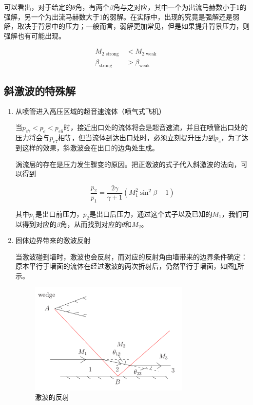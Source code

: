 可以看出，对于给定的$\theta$角，有两个$\beta$角与之对应，其中一个为出流马赫数小于1的强解，另一个为出流马赫数大于1的弱解。在实际中，出现的究竟是强解还是弱解，取决于背景中的压力；一般而言，弱解更加常见，但是如果提升背景压力，则强解也有可能出现。

\begin{align*}
    M_{2 \text { strong }}&<M_{2 \text { weak }}\\ 
    \beta_{\text {strong }}&>\beta_{\text {weak }}
\end{align*}

\subsection{斜激波的特殊解}

\begin{enumerate}
    \item 从喷管进入高压区域的超音速流体（喷气式飞机）
    
    当$p_{e7}<p_e<p_{e6}$时，接近出口处的流体将会是超音速流，并且在喷管出口处的压力将会与$p_{e7}$相等，但当流体到达出口处时，必须立刻提升压力到$p_e$，为了达到这样的效果，斜激波会在出口的边角处生成。

    涡流层的存在是压力发生骤变的原因。把正激波的式子代入斜激波的法向，可以得到

    \begin{equation*}
        \frac{p_{2}}{p_{1}}=\frac{2 \gamma}{\gamma+1}\left(M_{1}^{2} \sin ^{2} \beta-1\right)
    \end{equation*}

    其中$p_1$是出口前压力，$p_2$是出口后压力，通过这个式子以及已知的$M_1$，我们可以得到对应的$\beta$角，从而找到对应的$\theta$和$M_2$。

    \item 固体边界带来的激波反射
    
    当激波碰到墙时，激波也会反射，而对应的反射角由墙带来的边界条件确定：原本平行于墙面的流体在经过激波的两次折射后，仍然平行于墙面，如图\ref{9}所示。

    \begin{figure}[!ht]
        \centering
        \includegraphics[width=8cm]{figures/9.png}
        \caption{激波的反射}
        \label{9}
    \end{figure}
\end{enumerate}

